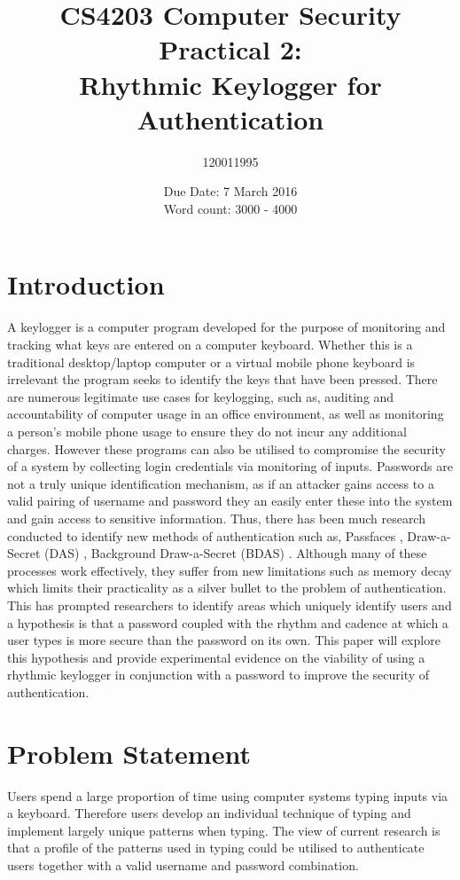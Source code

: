 \documentclass{article}
\title{CS4203 Computer Security Practical 2: \\ Rhythmic Keylogger for Authentication}
\author{120011995}
\date{Due Date: 7 March 2016 \break \\ Word count: 3000 - 4000}
\begin{document}
\maketitle

\section{Introduction}
A keylogger is a computer program developed for the purpose of monitoring and tracking what keys are entered on a computer keyboard. Whether this is a traditional desktop/laptop computer or a virtual mobile phone keyboard is irrelevant the program seeks to identify the keys that have been pressed. There are numerous legitimate use cases for keylogging, such as, auditing and accountability of computer usage in an office environment, as well as monitoring a person's mobile phone usage to ensure they do not incur any additional charges. However these programs can also be utilised to compromise the security of a system by collecting login credentials via monitoring of inputs. Passwords are not a truly unique identification mechanism, as if an attacker gains access to a valid pairing of username and password they an easily enter these into the system and gain access to sensitive information. Thus, there has been much research conducted to identify new methods of authentication such as, Passfaces \parencite{Dunphy}, Draw-a-Secret (DAS) \parencite{DunphyYan}, Background
Draw-a-Secret (BDAS) \parencite{DunphyYan}. Although many of these processes work effectively, they suffer from new limitations such as memory decay which limits their practicality as a silver bullet to the problem of authentication. This has prompted researchers to identify areas which uniquely identify users and a hypothesis is that a password coupled with the rhythm and cadence at which a user types is more secure than the password on its own. This paper will explore this hypothesis and provide experimental evidence on the viability of using a rhythmic keylogger in conjunction with a password to improve the security of authentication.         

\section{Problem Statement}
Users spend a large proportion of time using computer systems typing inputs via a keyboard. Therefore users develop an individual technique of typing and implement  largely unique patterns when typing. The view of current research is that a profile of the patterns used in typing could be utilised to authenticate users together with a valid username and password combination. \\
\end{document}
